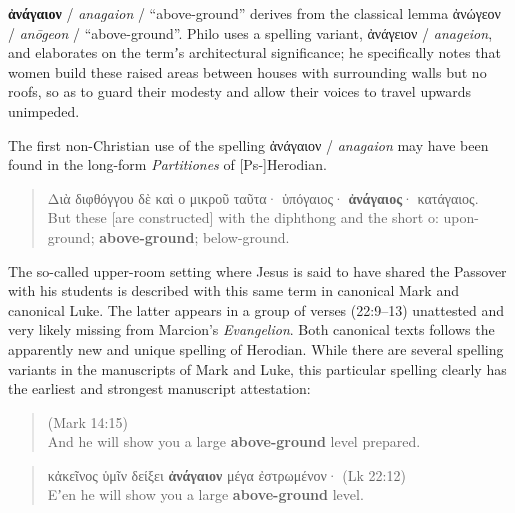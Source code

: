 \noindent{}\textbf{ἀνάγαιον} / \textit{anagaion} / “above-ground” derives from the classical lemma %
ἀνώγεον / \textit{anōgeon} / “above-ground”. %
Philo uses a spelling variant, %
ἀνάγειον / \textit{anageion}, and %
elaborates on the termʼs architectural significance; %
he specifically notes that women build these raised areas %
between houses with surrounding walls but no roofs, %
so as to guard their modesty and allow their voices to travel upwards unimpeded. %

The first non-Christian use of the spelling ἀνάγαιον / \textit{anagaion} %
may have been found in the long-form \textit{Partitiones} of [Ps-]Herodian. %

\vspace*{2mm} 
 \begin{quote}Διὰ διφθόγγου δὲ καὶ ο μικροῦ ταῦτα· %
 ὑπόγαιος· \textbf{ἀνάγαιος}· κατάγαιος. \\[1mm] %
 But these [are constructed] with the diphthong and the short o: %
 upon-ground; \textbf{above-ground}; below-ground. \end{quote} %
\vspace*{2mm}

\noindent{}The so-called upper-room setting where Jesus is said to have shared the Passover %
 with his students is described with this same term in canonical Mark and canonical Luke. %
 The latter appears in a group of verses (22:9--13) unattested and very likely missing from Marcion's \textit{Evangelion}. %
 Both canonical texts follows the apparently new and unique spelling of Herodian. %
 While there are several spelling variants in the manuscripts of Mark and Luke, %
 this particular spelling clearly has the earliest and strongest manuscript attestation: %

\vspace*{2mm} 
 \begin{quote} (Mark 14:15) \\ %
 And he will show you a large \textbf{above-ground} level prepared. \end{quote} %
\vspace*{1mm} 
 \begin{quote}κἀκεῖνος ὑμῖν δείξει \textbf{ἀνάγαιον} μέγα ἐστρωμένον· (Lk 22:12) \\ %
 Eʼen he will show you a large \textbf{above-ground} level. \end{quote} %
 \vspace*{2mm}

